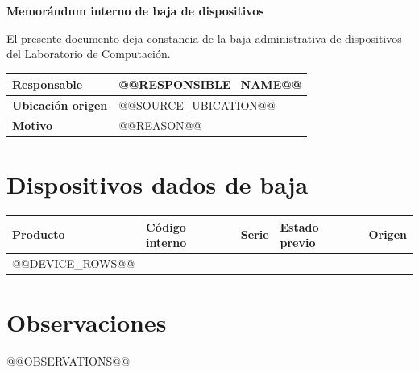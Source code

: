 \documentclass[letterpaper,12pt]{article}
\begin{document}
\begin{center}
    \LARGE\textbf{Memorándum interno de baja de dispositivos}
\end{center}

\vspace{0.3cm}

El presente documento deja constancia de la baja administrativa de dispositivos del Laboratorio de Computación.

\vspace{0.4cm}

\begin{tabular}{|p{}|p{}|}
    \hline
    \textbf{Responsable} & @@RESPONSIBLE_NAME@@ \\ \hline
    \textbf{Ubicación origen} & @@SOURCE_UBICATION@@ \\ \hline
    \textbf{Motivo} & @@REASON@@ \\ \hline
\end{tabular}

\vspace{0.5cm}

\section*{Dispositivos dados de baja}

\begin{longtable}{|p{}|p{}|p{}|p{}|p{}|}
    \hline
    \rowcolor[HTML]{cccccc}
    \textbf{Producto} &
    \textbf{Código interno} &
    \textbf{Serie} &
    \textbf{Estado previo} &
    \textbf{Origen} \\
    \hline
    @@DEVICE_ROWS@@
\end{longtable}

\vspace{0.2cm}

\section*{Observaciones}
@@OBSERVATIONS@@
\end{document}
